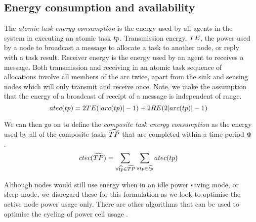 \newcommand{\functionTaskEnergyConsumption}[2]{
	\functionSignature{atec}
	{\varAtomicTask{}{}}
}
\subsection{Energy consumption and availability}
The \textit{atomic task energy consumption} is the energy used by all agents in the system in executing an atomic task $\varAtomicTask{}{}$. Transmission energy, $TE$, the power used by a node to  broadcast a message to allocate a task to another node, or reply with a task result. Receiver energy is the energy used by an agent to receives a message. Both transmission and receiving in an atomic task sequence of allocations involve all members of the arc twice, apart from the sink and sensing nodes which will only transmit and receive once. Note, we make the assumption that the energy of a broadcast of receipt of a message is independent of range. 
\begin{equation}
	\functionTaskEnergyConsumption{}{} 
	= 2\varTransmissionEnergy{}{} (\funcSize{\functionTaskArc{}{}}{} - 1)
	+ 2\varReceiverEnergy{}{} (2 \funcSize{\functionTaskArc{}{}}{} - 1)
\end{equation}

\newcommand{\functionSystemEnergyConsumption}[2]{
	\functionSignature{ctec}
	{\setCompositeTask{}{}}
}
We can then go on to define the \textit{composite task energy consumption} as the energy used by all of the composite tasks $\setCompositeTask{}{}$ that are completed within a time period $\Phi$.
\begin{equation}
	\functionSystemEnergyConsumption{}{} 
	= 
	\sum_{\forall \varCompositeTask{}{} \in \setCompositeTask{}{}}
	\sum_{\forall \varAtomicTask{}{} \in \varCompositeTask{}{}} \functionTaskEnergyConsumption{}{}
\end{equation}

Although nodes would still use energy when in an idle power saving mode, or sleep mode, we disregard these for this formulation as we look to optimise the active node power usage only. There are other algorithms that can be used to optimise the cycling of power cell usage \cite{DUMMY}.

\newcommand{\formalAgentEnergyAvailable}[2]{
	\functionFormal{fae}
	{\setAgents{}{}}
	{\setRealNumbersUnit{}{}}
}
\newcommand{\functionAgentEnergyAvailable}[2]{
	\functionSignature{fae_{\varTime{}{}}}
	{\varAgent{}{}}
}
\newcommand{\functionEnergyVariability}[2]{
	\ifx \\#1\\
	\functionSignature{rev_{\varTime{}{}}}
	{\setAgents{}{}}
	\else
	\functionSignature{rev_{\varTime{}{}}}{#1}
	\fi
}

